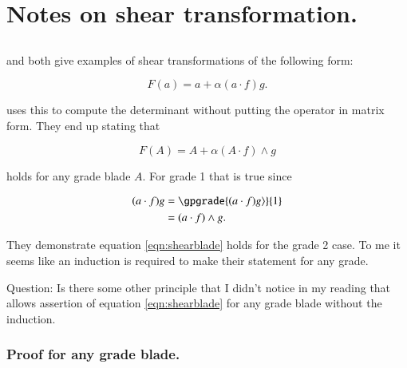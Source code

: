 
%





\chapter{Notes on shear transformation. }

%


\section{}

\cite{dorst2007gac} and \cite{doran2003gap}
both give examples of shear transformations of the following
form:

\[
F(a) = a + \alpha(a \cdot f) g.
\]

\cite{doran2003gap}
uses this to compute the determinant without putting the operator in matrix form.  They end up stating that 

\begin{equation}\label{eqn:shearblade}
F(A) = A + \alpha (A \cdot f) \wedge g
\end{equation}

holds for any grade blade $A$.  For grade 1 that is true since

\begin{align*}
(a \cdot f) g 
&= \gpgrade{(a \cdot f) g \rangle}{1} \\
&= (a \cdot f) \wedge g.
\end{align*}

They demonstrate equation \ref{eqn:shearblade}
holds for the grade 2 case.  To me it seems
like an induction is required to make their statement for any grade.

Question: Is there some other principle that I didn't notice in my reading that allows assertion of 
equation \ref{eqn:shearblade}
for any grade blade without the induction.

\subsection{Proof for any grade blade. }

